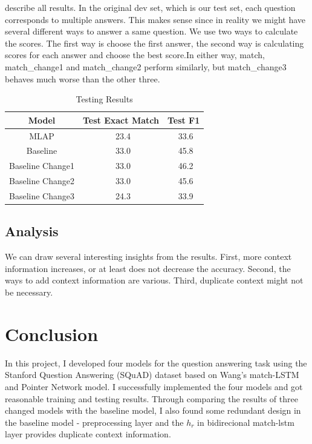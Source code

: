 \documentclass[modernstyle,12pt]{sjsuthesis}
\theoremstyle{definition}
\begin{document}
describe all results. In the original dev set, which is our test set, each question corresponds to multiple answers. This makes sense since in reality we might have several different ways to answer a same question. We use two ways to calculate the scores. The first way is choose the first answer, the second way is calculating scores for each answer and choose the best score.In either way, match, match\_change1 and match\_change2 perform similarly, but match\_change3 behaves much worse than the other three.


\begin{table}[htbp]\centering
  \caption{Testing Results}
  \label{tab:test_results}
  \begin{tabular}{|c|c|c|}
    \hline
    Model& Test Exact Match & Test F1 \\
    \hline\hline
    MLAP & \ 23.4 &\ 33.6 \\
    Baseline & \ 33.0 &\ 45.8 \\
    Baseline Change1 & \ 33.0 &\ 46.2 \\
    Baseline Change2 & \ 33.0 &\ 45.6 \\
    Baseline Change3 & \ 24.3 &\ 33.9 \\
    \hline
  \end{tabular}
\end{table}

\section{Analysis}
We can draw several interesting insights from the results. First, more context information increases, or at least does not decrease the accuracy. Second, the ways to add context information are various. Third, duplicate context might not be necessary.





\chapter{Conclusion}

In this project, I developed four models for the question answering task using the Stanford Question Answering (SQuAD) dataset based on Wang's match-LSTM and Pointer Network model. I successfully implemented the four models and got reasonable training and testing results. Through comparing the results of three changed models with the baseline model, I also found some redundant design in the baseline model - preprocessing layer and the $h_r$ in bidirecional match-lstm layer provides duplicate context information.
\end{document}
